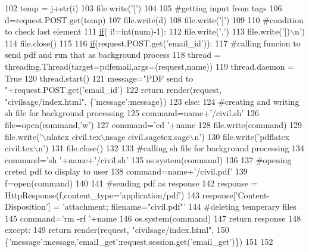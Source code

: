 \begin{DoxyCode}
102                 temp = j+str(i)
103                 file.write(\textcolor{stringliteral}{'['})
104 
105                 \textcolor{comment}{#getting input from tags}
106                 d=request.POST.get(temp)
107                 file.write(d)
108                 file.write(\textcolor{stringliteral}{']'})
109 
110                 \textcolor{comment}{#condition to check last element}
111                 \hyperlink{bootstrap_8min_8js_ac2d69f5011896c6ed4a54e0dd36f6334}{if}( i!=int(num)-1):
112                     file.write(\textcolor{stringliteral}{','})
113             file.write(\textcolor{stringliteral}{'])\(\backslash\)n'})
114         file.close()
115 
116         \hyperlink{bootstrap_8min_8js_ac2d69f5011896c6ed4a54e0dd36f6334}{if}(request.POST.get(\textcolor{stringliteral}{'email\_id'})):
117             \textcolor{comment}{#calling funcion to send pdf and run that as background process}
118             thread = threading.Thread(target=pdfemail,args=(request,name))
119             thread.daemon = \textcolor{keyword}{True}
120             thread.start()
121             message=\textcolor{stringliteral}{"PDF send to "}+request.POST.get(\textcolor{stringliteral}{'email\_id'})
122             \textcolor{keywordflow}{return} render(request, \textcolor{stringliteral}{"civilsage/index.html"}, \{\textcolor{stringliteral}{'message'}:message\})
123         \textcolor{keywordflow}{else}:
124             \textcolor{comment}{#creating and writing sh file for background processing}
125             command=name+\textcolor{stringliteral}{'/civil.sh'}
126             file=open(command,\textcolor{stringliteral}{'w'})
127             command=\textcolor{stringliteral}{'cd '}+name
128             file.write(command)
129             file.write(\textcolor{stringliteral}{'\(\backslash\)nlatex civil.tex\(\backslash\)nsage civil.sagetex.sage\(\backslash\)n'})
130             file.write(\textcolor{stringliteral}{'pdflatex civil.tex\(\backslash\)n'})
131             file.close()
132 
133             \textcolor{comment}{#calling sh file for background processing}
134             command=\textcolor{stringliteral}{'sh '}+name+\textcolor{stringliteral}{'/civil.sh'}
135             os.system(command)
136 
137             \textcolor{comment}{#opening creted pdf to display to user}
138             command=name+\textcolor{stringliteral}{'/civil.pdf'}
139             f=open(command)
140 
141             \textcolor{comment}{#sending pdf as response}
142             response = HttpResponse(f,content\_type=\textcolor{stringliteral}{'application/pdf'})
143             response[\textcolor{stringliteral}{'Content-Disposition'}] = \textcolor{stringliteral}{'attachment; filename="civil.pdf"'}
144             \textcolor{comment}{#deleting temperary files}
145             command=\textcolor{stringliteral}{'rm -rf '}+name
146             os.system(command)
147             \textcolor{keywordflow}{return} response
148     \textcolor{keywordflow}{except}:
149         \textcolor{keywordflow}{return} render(request, \textcolor{stringliteral}{"civilsage/index.html"},
150         \{\textcolor{stringliteral}{'message'}:message,\textcolor{stringliteral}{'email\_get'}:request.session.get(\textcolor{stringliteral}{'email\_get'})\})
151 
152 
\end{DoxyCode}


